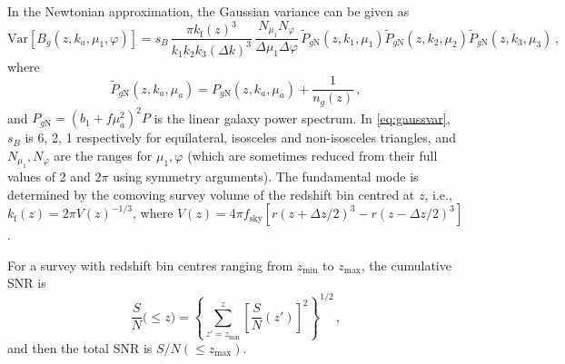 In the Newtonian approximation, the Gaussian variance can be given as \cite{Scoccimarro:2003wn, Karagiannis:2018jdt}
\begin{equation}
{{\mathrm{Var}} [{B_{g}}(z, k_a,\mu_{1},\varphi)]}
=s_B\, \frac{\pi k_{\mathrm{f}}(z)^3}{k_1k_2k_3 (\Delta k)^3}\,\frac{N_{\mu_1}N_\varphi}{\Delta \mu_1 \Delta \varphi} \, \tilde{P}_{g{\mathrm{N}}}(z,k_{1},\mu_{1}) \tilde{P}_{g{\mathrm{N}}}(z,k_{2},\mu_{2})\tilde{P}_{g{\mathrm{N}}}(z,k_{3},\mu_{3})\,,
\end{equation}
where 
\begin{equation}
\tilde{P}_{g{\mathrm{N}}}(z, k_{a}, \mu_{a}) = P_{g{\mathrm{N}}}(z, k_{a}, \mu_{a}) + \frac{1}{n_{g}(z)}\,,  %
\end{equation}
and ${P}_{g{\mathrm{N}}}=(b_1+f\mu_a^2)^2P$ is the linear galaxy power spectrum.
In \eqref{eq:gaussvar}, $s_{B}$ is 6, 2, 1 respectively for equilateral, isosceles and non-isosceles triangles, and $N_{\mu_1},N_\varphi$ are the ranges for $\mu_1,  \varphi $ (which are sometimes reduced from their full values of 2 and $2\pi$ using symmetry arguments).
The fundamental mode is determined by the comoving survey volume of the redshift bin centred at $z$, i.e.,  $k_{\mathrm{f}}(z) = {2\pi}{V(z)^{-1/3}}$, where $V(z)=4\pi  f_{\mathrm{sky}}[r(z+\Delta z/2)^3 - r(z-\Delta z/2)^3]$.

For a survey with redshift bin centres ranging from $z_{\mathrm{min}}$ to $z_{\mathrm{max}}$,  the cumulative SNR  is
\begin{equation} \label{csnr}
\frac{S}{N}\big(\leq z\big) = \left\{\sum_{z'=z_{\mathrm{min}}}^z \left[\frac{S}{N}(z')\right]^{2} \right\}^{1/2} \,,
\end{equation}
and then the total SNR is $S/N(\leq z_{\mathrm{max}})$.
%
%
